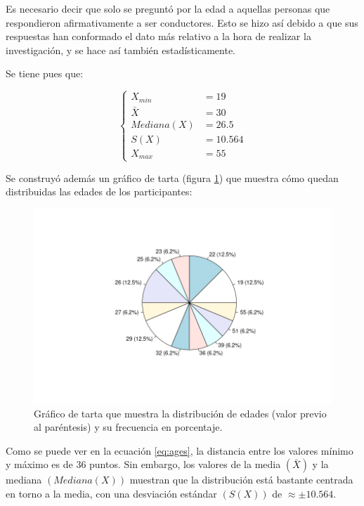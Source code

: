 Es necesario decir que solo se preguntó por la edad a aquellas personas que respondieron
afirmativamente a ser conductores. Esto se hizo así debido a que sus respuestas han
conformado el dato más relativo a la hora de realizar la investigación, y se hace así
también estadísticamente.

Se tiene pues que:

\begin{equation}\label{eq:ages}
  \left\{\begin{aligned}
    X_{min}               & = 19     \\
    \bar{X}               & = 30     \\
    Mediana\left(X\right) & = 26.5   \\
    S\left(X\right)       & = 10.564 \\
    X_{max}               & = 55
  \end{aligned}\right.
\end{equation}

Se construyó además un gráfico de tarta (figura \ref{fig:ages}) que muestra cómo
quedan distribuidas las edades de los participantes:

\begin{figure}[H]
  \centering
  \includegraphics[width=\linewidth]{images/ages-pie.png}
  \caption{Gráfico de tarta que muestra la distribución de edades (valor previo al paréntesis) y su frecuencia en porcentaje.}
  \label{fig:ages}
\end{figure}

Como se puede ver en la ecuación \ref{eq:ages}, la distancia entre los valores
mínimo y máximo es de $36$ puntos. Sin embargo, los valores de la media $\left(\bar{X}\right)$
y la mediana $\left(Mediana\left(X\right)\right)$ muestran que la distribución está
bastante centrada en torno a la media, con una desviación estándar $\left(S\left(X\right)\right)$
de $\approx\pm10.564$.

